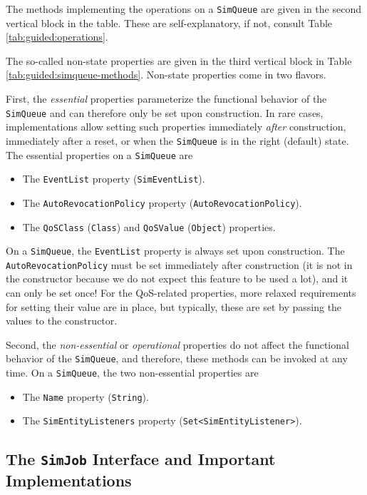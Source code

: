 \documentclass[12pt]{book}
\begin{document}
The methods implementing the operations on a \lstinline|SimQueue|
  are given in the second vertical block in the table.
These are self-explanatory, if not,
  consult Table \ref{tab:guided:operations}.

The so-called non-state properties are given in the third
  vertical block in Table \ref{tab:guided:simqueue-methods}.
Non-state properties come in two flavors.

First, the {\em essential\/} properties parameterize the
  functional behavior of the \lstinline|SimQueue|
  and can therefore only be set upon construction.
In rare cases, implementations allow setting
  such properties immediately {\em after\/}
  construction,
  immediately after a reset,
  or when the \lstinline|SimQueue| is in the right (default) state.
The essential properties on a \lstinline|SimQueue| are
\begin{itemize}
  \item The \lstinline|EventList| property (\lstinline|SimEventList|).
  \item The \lstinline|AutoRevocationPolicy| property (\lstinline|AutoRevocationPolicy|).
  \item The \lstinline|QoSClass| (\lstinline|Class|)
        and \lstinline|QoSValue| (\lstinline|Object|) properties.
\end{itemize}
On a \lstinline|SimQueue|, the \lstinline|EventList| property is always set upon
  construction.
The \lstinline|AutoRevocationPolicy| must be set immediately
  after construction (it is not in the constructor because we do not
  expect this feature to be used a lot),
  and it can only be set once!
For the QoS-related properties, more relaxed requirements
  for setting their value are in place,
  but typically,
  these are set by passing the values to the constructor.

Second, the {\em non-essential\/} or {\em operational\/} properties
  do not affect the functional behavior of the \lstinline|SimQueue|,
  and therefore,
  these methods can be invoked at any time.
On a \lstinline|SimQueue|,
  the two non-essential properties are
\begin{itemize}
\item The \lstinline|Name| property (\lstinline|String|).
\item The \lstinline|SimEntityListeners| property (\lstinline|Set<SimEntityListener>|).
\end{itemize}

\subsection{The \texttt{SimJob} Interface and Important Implementations}
\end{document}
